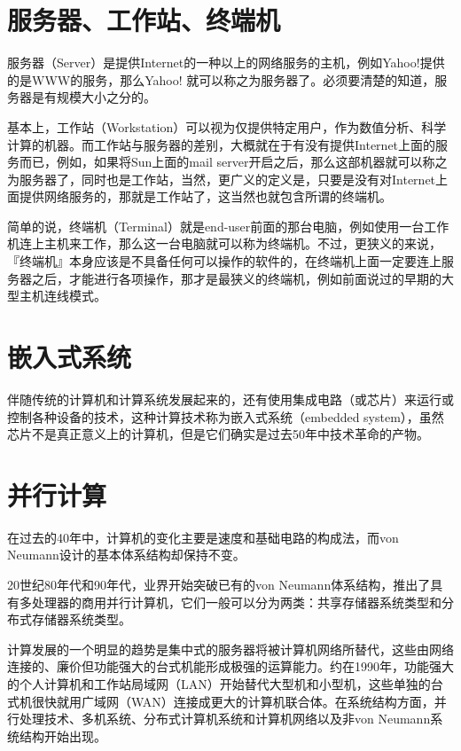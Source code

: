 \chapter{服务器、工作站、终端机}

服务器（Server）是提供Internet的一种以上的网络服务的主机，例如Yahoo!提供的是WWW的服务，那么Yahoo! 就可以称之为服务器了。必须要清楚的知道，服务器是有规模大小之分的。

基本上，工作站（Workstation）可以视为仅提供特定用户，作为数值分析、科学计算的机器。而工作站与服务器的差别，大概就在于有没有提供Internet上面的服务而已，例如，如果将Sun上面的mail server开启之后，那么这部机器就可以称之为服务器了，同时也是工作站，当然，更广义的定义是，只要是没有对Internet上面提供网络服务的，那就是工作站了，这当然也就包含所谓的终端机。

简单的说，终端机（Terminal）就是end-user前面的那台电脑，例如使用一台工作机连上主机来工作，那么这一台电脑就可以称为终端机。不过，更狭义的来说，『终端机』本身应该是不具备任何可以操作的软件的，在终端机上面一定要连上服务器之后，才能进行各项操作，那才是最狭义的终端机，例如前面说过的早期的大型主机连线模式。

\chapter{嵌入式系统}

伴随传统的计算机和计算系统发展起来的，还有使用集成电路（或芯片）来运行或控制各种设备的技术，这种计算技术称为嵌入式系统（embedded system），虽然芯片不是真正意义上的计算机，但是它们确实是过去50年中技术革命的产物。

\chapter{并行计算}

在过去的40年中，计算机的变化主要是速度和基础电路的构成法，而von Neumann设计的基本体系结构却保持不变。

20世纪80年代和90年代，业界开始突破已有的von Neumann体系结构，推出了具有多处理器的商用并行计算机，它们一般可以分为两类：共享存储器系统类型和分布式存储器系统类型。

计算发展的一个明显的趋势是集中式的服务器将被计算机网络所替代，这些由网络连接的、廉价但功能强大的台式机能形成极强的运算能力。约在1990年，功能强大的个人计算机和工作站局域网（LAN）开始替代大型机和小型机，这些单独的台式机很快就用广域网（WAN）连接成更大的计算机联合体。在系统结构方面，并行处理技术、多机系统、分布式计算机系统和计算机网络以及非von Neumann系统结构开始出现。

